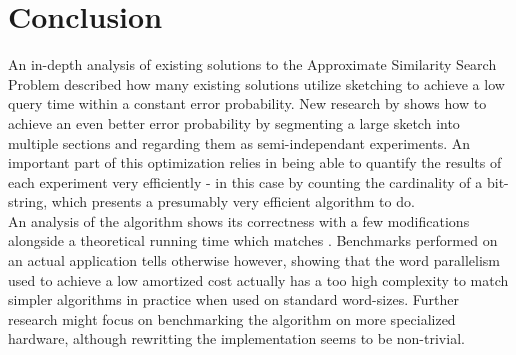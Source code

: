 \section{Conclusion}
An in-depth analysis of existing solutions to the Approximate Similarity Search Problem described how many existing solutions utilize sketching to achieve a low query time within a constant error probability. New research by \citep{fast-similarity-search} shows how to achieve an even better error probability by segmenting a large sketch into multiple sections and regarding them as semi-independant experiments. An important part of this optimization relies in being able to quantify the results of each experiment very efficiently - in this case by counting the cardinality of a bit-string, which \citep{fast-similarity-search} presents a presumably very efficient algorithm to do.\\
An analysis of the algorithm shows its correctness with a few modifications alongside a theoretical running time which matches \cite{fast-similarity-search}. Benchmarks performed on an actual application tells otherwise however, showing that the word parallelism used to achieve a low amortized cost actually has a too high complexity to match simpler algorithms in practice when used on standard word-sizes. Further research might focus on benchmarking the algorithm on more specialized hardware, although rewritting the implementation seems to be non-trivial.
